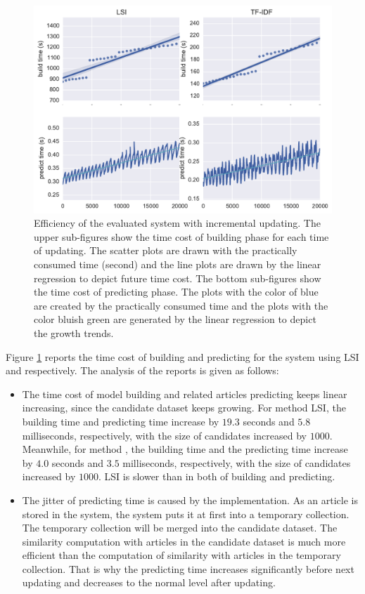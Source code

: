 \begin{figure}[!htb]
    \centering
    \includegraphics[width=\textwidth]{fig/runtime_inc}
    \caption[Efficiency of the evaluated system with incremental updating]{Efficiency of the evaluated system with incremental updating. The upper sub-figures show the time cost of building phase for each time of updating. The scatter plots are drawn with the practically consumed time (second) and the line plots are drawn by the linear regression to depict future time cost. The bottom sub-figures show the time cost of predicting phase. The plots with the color of blue are created by the practically consumed time and the plots with the color bluish green are generated by the linear regression to depict the growth trends. }
    \label{fig:runtime_inc}
\end{figure}

Figure \ref{fig:runtime_inc} reports the time cost of building and predicting for the system using LSI and \tfidf{} respectively. The analysis of the reports is given as follows:

\begin{itemize}
    \item The time cost of model building and related articles predicting keeps linear increasing, since the candidate dataset keeps growing. For method LSI, the building time and predicting time increase by $19.3$ seconds and $5.8$ milliseconds, respectively, with the size of candidates increased by $1000$. Meanwhile, for method \tfidf{}, the building time and the predicting time increase by $4.0$ seconds and $3.5$ milliseconds, respectively, with the size of candidates increased by $1000$. LSI is slower than \tfidf{} in both of building and predicting. 
    \item The jitter of predicting time is caused by the implementation. As an article is stored in the system, the system puts it at first into a temporary collection. The temporary collection will be merged into the candidate dataset. The similarity computation with articles in the candidate dataset is much more efficient than the computation of similarity with articles in the temporary collection. That is why the predicting time increases significantly before next updating and decreases to the normal level after updating. 
    
\end{itemize}

